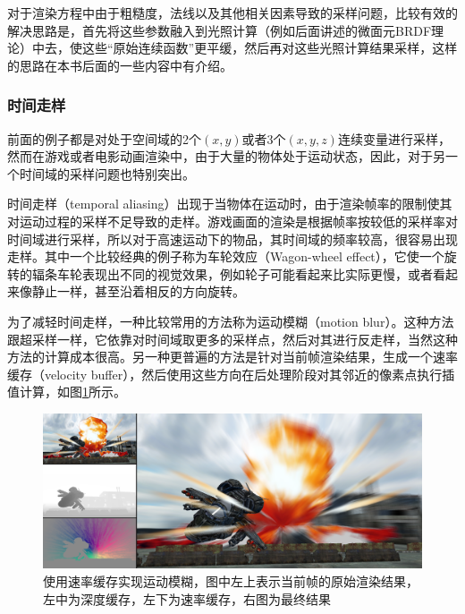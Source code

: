 对于渲染方程中由于粗糙度，法线以及其他相关因素导致的采样问题，比较有效的解决思路是，首先将这些参数融入到光照计算（例如后面讲述的微面元BRDF理论）中去，使这些“原始连续函数”更平缓，然后再对这些光照计算结果采样，这样的思路在本书后面的一些内容中有介绍。



\subsubsection{时间走样}
前面的例子都是对处于空间域的2个$(x,y)$或者3个$(x,y,z)$连续变量进行采样，然而在游戏或者电影动画渲染中，由于大量的物体处于运动状态，因此，对于另一个时间域的采样问题也特别突出。

时间走样（temporal aliasing）出现于当物体在运动时，由于渲染帧率的限制使其对运动过程的采样不足导致的走样。游戏画面的渲染是根据帧率按较低的采样率对时间域进行采样，所以对于高速运动下的物品，其时间域的频率较高，很容易出现走样。其中一个比较经典的例子称为车轮效应（Wagon-wheel effect），它使一个旋转的辐条车轮表现出不同的视觉效果，例如轮子可能看起来比实际更慢，或者看起来像静止一样，甚至沿着相反的方向旋转。

为了减轻时间走样，一种比较常用的方法称为运动模糊（motion blur）。这种方法跟超采样一样，它依靠对时间域取更多的采样点，然后对其进行反走样，当然这种方法的计算成本很高。另一种更普遍的方法是针对当前帧渲染结果，生成一个速率缓存（velocity buffer）\cite{a:AReconstructionFilterforPlausibleMotionBlur}，然后使用这些方向在后处理阶段对其邻近的像素点执行插值计算，如图\ref{f:intro-motion-blur}所示。

\begin{figure}
	\includegraphics[width=1.\textwidth]{figures/intro/motion-blur}
	\caption{使用速率缓存实现运动模糊，图中左上表示当前帧的原始渲染结果，左中为深度缓存，左下为速率缓存，右图为最终结果}
	\label{f:intro-motion-blur}
\end{figure}



